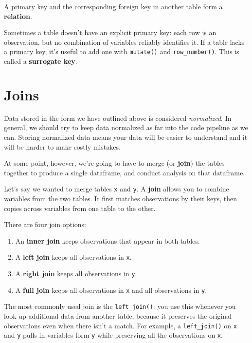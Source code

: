 \documentclass[]{book}
\providecommand{\tightlist}{%
  \setlength{\itemsep}{0pt}\setlength{\parskip}{0pt}}
\begin{document}
A primary key and the corresponding foreign key in another table form a
\textbf{relation}.

Sometimes a table doesn't have an explicit primary key: each row is an
observation, but no combination of variables reliably identifies it. If
a table lacks a primary key, it's useful to add one with
\texttt{mutate()} and \texttt{row\_number()}. This is called a
\textbf{surrogate key}.

\section{Joins}\label{joins}

Data stored in the form we have outlined above is considered
\emph{normalized}. In general, we should try to keep data normalized as
far into the code pipeline as we can. Storing normalized data means your
data will be easier to understand and it will be harder to make costly
mistakes.

At some point, however, we're going to have to merge (or \textbf{join})
the tables together to produce a single dataframe, and conduct analysis
on that dataframe.

Let's say we wanted to merge tables \texttt{x} and \texttt{y}. A
\textbf{join} allows you to combine variables from the two tables. It
first matches observations by their keys, then copies across variables
from one table to the other.

There are four join options:

\begin{enumerate}
\def\labelenumi{\arabic{enumi}.}
\tightlist
\item
  An \textbf{inner join} keeps observations that appear in both tables.
\item
  A \textbf{left join} keeps all observations in \texttt{x}.
\item
  A \textbf{right join} keeps all observations in \texttt{y}.
\item
  A \textbf{full join} keeps all observations in \texttt{x} and all
  observations in \texttt{y}.
\end{enumerate}

The most commonly used join is the \texttt{left\_join()}: you use this
whenever you look up additional data from another table, because it
preserves the original observations even when there isn't a match. For
example, a \texttt{left\_join()} on \texttt{x} and \texttt{y} pulls in
variables form \texttt{y} while preserving all the observations on
\texttt{x}.
\end{document}
